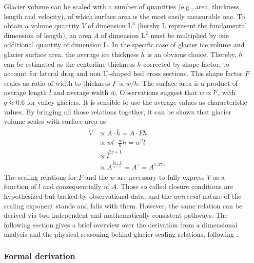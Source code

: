             Glacier volume can be scaled with a number of quantities (e.g., area, thickness, length and velocity), of which surface area is the most easily measurable one. To obtain a volume quantity $V$ of dimension $\mathrm{L}^3$ (hereby $\mathrm{L}$ represent the fundamental dimension of length), an area $A$ of dimension $\mathrm{L}^2$ must be multiplied by one additional quantity of dimension $\mathrm{L}$. In the specific case of glacier ice volume and glacier surface area, the average ice thickness $\bar{h}$ is an obvious choice. Thereby, $\bar{h}$ can be estimated as the centerline thickness $h$ corrected by shape factor, to account for lateral drag and non U-shaped bed cross sections. This shape factor $F$ scales as ratio of width to thickness $F\propto w/h$. The surface area is a product of average length $\bar l$ and average width $\bar w$. Observations suggest that $w\propto l^q$, with $q\approx 0.6$ for valley glaciers. It is sensible to use the average values as characteristic values. By bringing all those relations together, it can be shown that glacier volume scales with surface area as
            \begin{align}
            \begin{split}
                V &\propto A\cdot \bar{h} = A\cdot Fh \\
                    &\propto \bar w\bar l\cdot \frac{\bar w}{h}h = \bar w^2\bar l \\
                    &\propto \bar l^{2q+1} \\
                    &\propto A^\frac{2q+1}{q+1} = A^\gamma = A^{1.375}
            \end{split}
            \end{align}
            The scaling relations for $F$ and the $w$ are necessary to fully express $V$ as a function of $l$ and consequentially of $A$. Those so called closure conditions are hypothesized but backed by observational data, and the \textit{universal} nature of the scaling exponent stands and falls with them. However, the same \vas{} relation can be derived via two independent and mathematically consistent pathways. The following section gives a brief overview over the derivation from a dimensional analysis and the physical reasoning behind glacier scaling relations, following \citet[Section 4 - 7]{Bahr2015}.
        
        
        \subsubsection{Formal derivation} %
        \label{ssub:formal_derivation}

